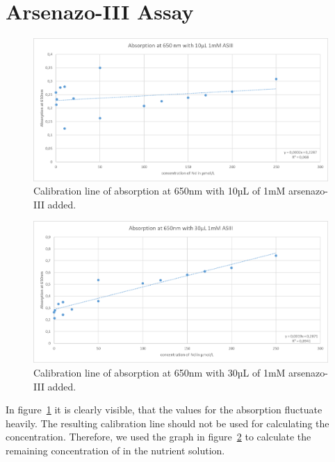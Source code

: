 \section{Arsenazo-III Assay\authorA}

\begin{figure}[H]
    \centering
    \includegraphics[width=1\textwidth]{./media/images/absorption10}
    \caption{Calibration line of absorption at 650nm with 10µL of 1mM arsenazo-III added.}
    \label{fig:absorption10}
\end{figure}

\begin{figure}[H]
    \centering
    \includegraphics[width=1\textwidth]{media/images/absorption30}
    \caption{Calibration line of absorption at 650nm with 30µL of 1mM arsenazo-III added.}
    \label{fig:absorption30}
\end{figure}

In figure~\ref{fig:absorption10} it is clearly visible, that the values for the absorption fluctuate heavily.
The resulting calibration line should not be used for calculating the concentration.
Therefore, we used the graph in figure~\ref{fig:absorption30} to calculate the remaining concentration of  in the nutrient solution.

